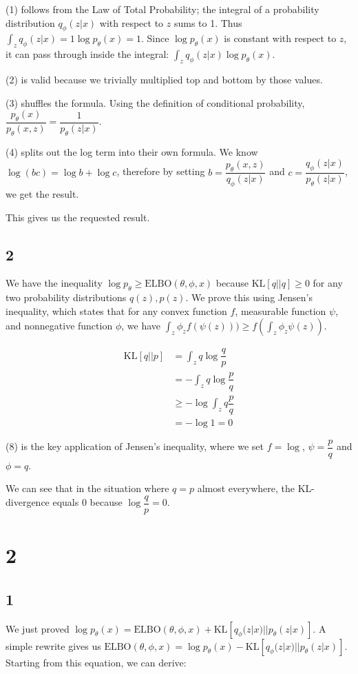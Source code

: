 \documentclass{article}
\begin{document}
(1) follows from the Law of Total Probability; the integral of a probability distribution $q_\phi(z|x)$ with respect to $z$ sums to 1. Thus $\int_{z} q_\phi(z|x) = 1\log p_\theta(x) = 1$. Since $\log p_\theta(x)$ is constant with respect to $z$, it can pass through inside the integral: $\int_{z} q_\phi (z|x) \log p_\theta(x)$.

(2) is valid because we trivially multiplied top and bottom by those values.

(3) shuffles the formula. Using the definition of conditional probability, $\dfrac{p_\theta(x)}{p_\theta(x,z)} = \dfrac{1}{p_\theta(z|x)}$.

(4) splits out the log term into their own formula. We know $\log(bc) = \log b + \log c$, therefore by setting $b = \dfrac{p_\theta(x,z)}{q_\phi(z|x)}$ and $c = \dfrac{q_\phi(z|x)}{p_\theta(z|x)}$, we get the result.

This gives us the requested result.

\subsection{2}
We have the inequality $\log p_\theta \geq \text{ELBO}(\theta, \phi, x) $ because $\text{KL}[q || q] \geq 0$ for any two probability distributions $q(z), p(z)$. We prove this using Jensen's inequality, which states that for any convex function $f$, measurable function $\psi$, and nonnegative function $\phi$, we have $\int_{z} \phi_z f(\psi(z))) \geq f (\int_{z} \phi_z \psi(z))$.

\begin{align}
    \text{KL}[q || p] 
    &= \int_{z} q \log \dfrac{q}{p} \\
    &= - \int_{z} q \log \dfrac{p}{q} \\ 
    &\geq - \log \int_{z} q \dfrac{p}{q} \\
    &= -\log 1 = 0
\end{align}

(8) is the key application of Jensen's inequality, where we set $f = \log$, $\psi = \dfrac{p}{q}$ and $\phi = q$.

We can see that in the situation where $q = p$ almost everywhere, the KL-divergence equals $0$ because $\log\dfrac{q}{p} = 0$.

\section{2}
\subsection{1}
We just proved $\log p_\theta(x) = \text{ELBO}(\theta, \phi, x) + \text{KL}[q_\phi(z|x) || p_\theta(z|x)]$. A simple rewrite gives us $\text{ELBO}(\theta, \phi, x) = \log p_\theta(x) - \text{KL}[q_\phi(z|x) || p_\theta(z|x)]$. Starting from this equation, we can derive:
\end{document}
